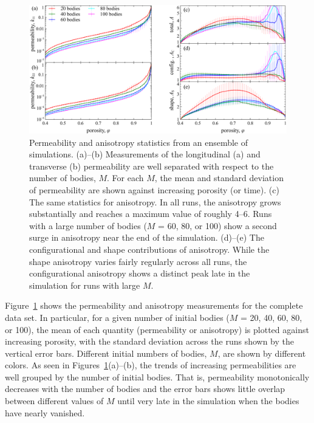 \documentclass[3p]{elsarticle}
\begin{document}
\begin{figure}%
\centering
\includegraphics[width = 0.9 \textwidth]{./figs/fig5.pdf}
\caption{Permeability and anisotropy statistics from an ensemble of simulations. (a)--(b) Measurements of the longitudinal (a) and transverse (b) permeability are well separated with respect to the number of bodies, $M$. For each $M$, the mean and standard deviation of permeability are shown against increasing porosity (or time). (c) The same statistics for anisotropy. In all runs, the anisotropy grows substantially and reaches a maximum value of roughly 4--6. Runs with a large number of bodies ($M$ = 60, 80, or 100) show a second surge in anisotropy near the end of the simulation. (d)--(e) The configurational and shape contributions of anisotropy. While the shape anisotropy varies fairly regularly across all runs, the configurational anisotropy shows a distinct peak late in the simulation for runs with large $M$.
\label{fig5}
}
\end{figure}

Figure~\ref{fig5} shows the permeability and anisotropy measurements for the complete data set. In particular, for a given number of initial bodies ($M$ = 20, 40, 60, 80, or 100), the mean of each quantity (permeability or anisotropy) is plotted against increasing porosity, with the standard deviation across the runs shown by the vertical error bars. Different initial numbers of bodies, $M$, are shown by different colors. As seen in Figures~\ref{fig5}(a)--(b), the trends of increasing permeabilities are well grouped by the number of initial bodies. That is, permeability monotonically decreases with the number of bodies and the error bars shows little overlap between different values of $M$ until very late in the simulation when the bodies have nearly vanished. 
\end{document}
